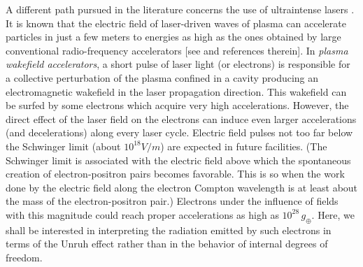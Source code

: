 \documentclass[12pt,nofootinbib,floatfix,aps,prd,showpacs,amsmath,amssymb,eqsecnum]{revtex4-2}
\let\cite\citep
\begin{document}
A different path pursued in the literature 
concerns the use of ultraintense
lasers \cite{Chenetal99,Schutzholdetal06}. It is known that the electric 
field of laser-driven waves of plasma can accelerate particles 
in just a few meters to energies as high as the ones obtained by large 
conventional  radio-frequency accelerators [see \textcite{Mourouetal06} 
and references therein]. In {\em plasma wakefield accelerators}, a short pulse of 
laser light (or electrons) is responsible for a collective perturbation of 
the plasma confined in a cavity producing an electromagnetic wakefield 
in the laser propagation direction. This wakefield can be surfed by some
electrons which acquire very high accelerations. 
However, the direct effect of the laser field  on the electrons 
can induce even larger accelerations (and decelerations) along 
every laser cycle. Electric field pulses not too far below the Schwinger limit 
(about $10^{18} V/m$) are expected in future facilities.  
(The Schwinger limit is 
associated with the electric field above which the spontaneous creation 
of electron-positron pairs becomes favorable. This is so when 
the work done by the electric field along the electron Compton 
wavelength is at 
least about the mass of the electron-positron pair.) Electrons under the
influence of fields with this magnitude could reach proper accelerations 
as high as $ 10^{28} \, g_{\oplus}$. Here, we shall be interested in interpreting
the radiation emitted by such electrons in terms of the Unruh effect
rather than in the behavior of internal degrees of freedom.
\end{document}
